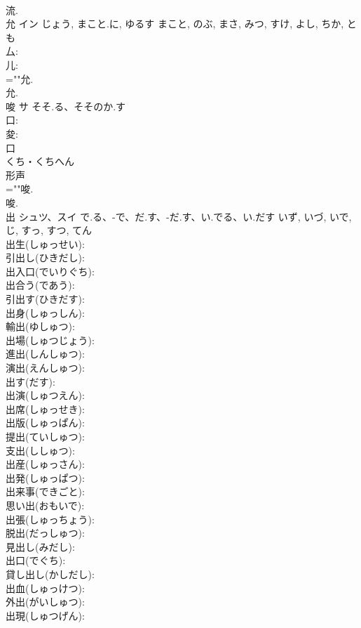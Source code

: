 \documentclass[8pt]{extreport}
\begin{document}
\begin{CJK}{UTF8}{min}
\\	流.
\\	允	イン	じょう, まこと.に, ゆるす	まこと, のぶ, まさ, みつ, すけ, よし, ちか, とも	
\\	厶: 
\\	儿: 
\\	=""允.
\\	允.
\\	唆	サ	そそ.る、そそのか.す		
\\	口: 
\\	夋: 
\\	口	
\\	くち・くちへん	
\\	形声 
\\	=""唆.
\\	唆.
\\	出	シュツ、スイ	で.る、-で、だ.す、-だ.す、い.でる、い.だす	いず, いづ, いで, じ, すっ, すつ, てん	
\\	出生(しゅっせい): 
\\	引出し(ひきだし): 
\\	出入口(でいりぐち): 
\\	出合う(であう): 
\\	引出す(ひきだす): 
\\	出身(しゅっしん): 
\\	輸出(ゆしゅつ): 
\\	出場(しゅつじょう): 
\\	進出(しんしゅつ): 
\\	演出(えんしゅつ): 
\\	出す(だす): 
\\	出演(しゅつえん): 
\\	出席(しゅっせき): 
\\	出版(しゅっぱん): 
\\	提出(ていしゅつ): 
\\	支出(ししゅつ): 
\\	出産(しゅっさん): 
\\	出発(しゅっぱつ): 
\\	出来事(できごと): 
\\	思い出(おもいで): 
\\	出張(しゅっちょう): 
\\	脱出(だっしゅつ): 
\\	見出し(みだし): 
\\	出口(でぐち): 
\\	貸し出し(かしだし): 
\\	出血(しゅっけつ): 
\\	外出(がいしゅつ): 
\\	出現(しゅつげん): 

\end{CJK}
\end{document}

